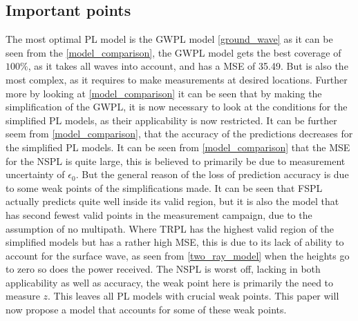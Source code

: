 \subsection*{Important points}
The most optimal PL model is the GWPL model \eqref{ground_wave} as it can be seen from the  \autoref{model_comparison}, the GWPL model gets the best coverage of $100\%$, as it takes all waves into account, and has a MSE of 35.49. But is also the most complex, as it requires to make measurements at desired locations. Further more by looking at \autoref{model_comparison} it can be seen that by making the simplification of the GWPL, it is now necessary to look at the conditions for the simplified PL models, as their applicability is now restricted. It can be further seem from \autoref{model_comparison}, that the accuracy of the predictions decreases for the simplified PL models.
It can be seen from \autoref{model_comparison} that the MSE for the NSPL is quite large, this is believed to primarily be due to measurement uncertainty of $\epsilon_{0}$.  
But the general reason of the loss of prediction accuracy is due to some weak points of the simplifications made. It can be seen that FSPL actually predicts quite well inside its valid region, but it is also the model that has second fewest valid points in the measurement campaign, due to the assumption of no multipath. Where TRPL has the highest valid region of the simplified models but has a rather high MSE, this is due to its lack of ability to account for the surface wave, as seen from \eqref{two_ray_model} when the heights go to zero so does the power received. The NSPL is worst off, lacking in both applicability as well as accuracy, the weak point here is primarily the need to measure $z$. This leaves all PL models with crucial weak points. This paper will now propose a model that accounts for some of these weak points. 





